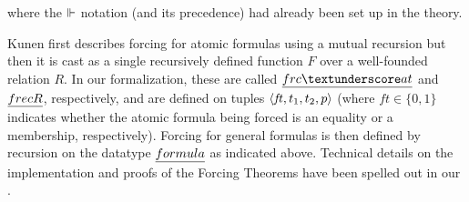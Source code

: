 where the $\Vdash$ notation (and its precedence) had already been set up in the
 theory.

Kunen first describes forcing for atomic formulas using a mutual
recursion
but then \cite[p.~257]{kunen2011set} it is cast as a single
recursively defined function $F$ over a well-founded  relation $R$.
In our formalization, these are called $\frcat$ and 
$\isa{frecR}$, respectively, and are defined on tuples $\langle \mathit{ft},t_1,t_2,p\rangle$ (where
$\mathit{ft}\in\{0,1\}$ indicates whether the atomic formula being
forced is an equality or a membership, respectively).
Forcing for general formulas is then defined by recursion on the
datatype $\formula$ as indicated above. Technical details on the
implementation and proofs of the
Forcing Theorems have been spelled out in our
\cite{2020arXiv200109715G}.

